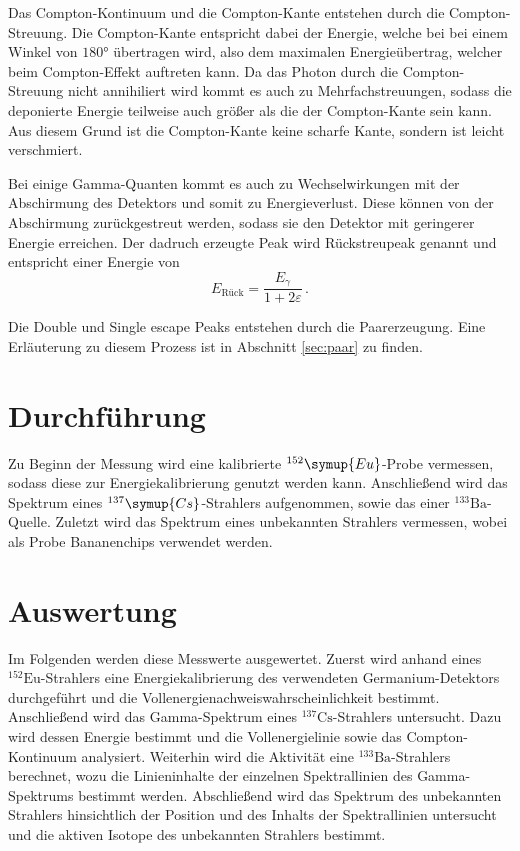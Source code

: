 Das Compton-Kontinuum und die Compton-Kante entstehen durch die Compton-Streuung.
Die Compton-Kante entspricht dabei der Energie, welche bei bei einem Winkel von $180°$ übertragen wird, also dem maximalen Energieübertrag, welcher beim Compton-Effekt auftreten kann.
Da das Photon durch die Compton-Streuung nicht annihiliert wird kommt es auch zu Mehrfachstreuungen, sodass die deponierte Energie teilweise auch größer als die der Compton-Kante sein kann.
Aus diesem Grund ist die Compton-Kante keine scharfe Kante, sondern ist leicht verschmiert.

Bei einige Gamma-Quanten kommt es auch zu Wechselwirkungen mit der Abschirmung des Detektors und somit zu Energieverlust.
Diese können von der Abschirmung zurückgestreut werden, sodass sie den Detektor mit geringerer Energie erreichen.
Der dadruch erzeugte Peak wird Rückstreupeak genannt und entspricht einer Energie von
\begin{equation}
    \label{eq:ruckstreu}
E_\text{Rück}= \frac{E_{\gamma}}{1+2\varepsilon}\, .
\end{equation}

Die Double und Single escape Peaks entstehen durch die Paarerzeugung.
Eine Erläuterung zu diesem Prozess ist in Abschnitt \ref{sec:paar} zu finden. 

\section{Durchführung}
Zu Beginn der Messung wird eine kalibrierte $^{152}\symup{Eu}$-Probe vermessen, sodass diese zur Energiekalibrierung genutzt werden kann.
Anschließend wird das Spektrum eines $^{137}\symup{Cs}$-Strahlers aufgenommen, sowie das einer $^{133}\text{Ba}$-Quelle.
Zuletzt wird das Spektrum eines unbekannten Strahlers vermessen, wobei als Probe Bananenchips verwendet werden.

\section{Auswertung}
Im Folgenden werden diese Messwerte ausgewertet. Zuerst wird anhand eines $^{152}\text{Eu}$-Strahlers eine Energiekalibrierung
des verwendeten Germanium-Detektors durchgeführt und die Vollenergienachweiswahrscheinlichkeit bestimmt.
Anschließend wird das Gamma-Spektrum eines $^{137}\text{Cs}$-Strahlers untersucht. Dazu wird dessen Energie bestimmt und die 
Vollenergielinie sowie das Compton-Kontinuum analysiert. 
Weiterhin wird die Aktivität eine $^{133}\text{Ba}$-Strahlers berechnet, wozu die Linieninhalte der einzelnen Spektrallinien 
des Gamma-Spektrums bestimmt werden. 
Abschließend wird das Spektrum des unbekannten Strahlers hinsichtlich der Position und des Inhalts der Spektrallinien untersucht
und die aktiven Isotope des unbekannten Strahlers bestimmt.
